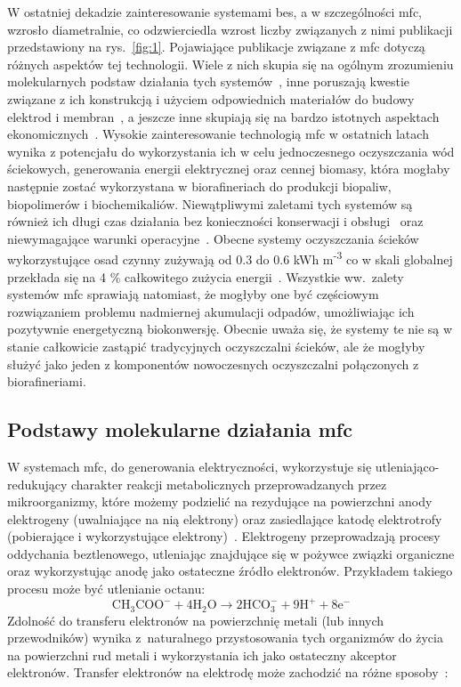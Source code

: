 W ostatniej dekadzie zainteresowanie systemami \acrshort{bes},
a w szczególności \acrshort{mfc}, wzrosło diametralnie, co odzwierciedla wzrost
liczby związanych z nimi publikacji przedstawiony na rys.~\ref{fig:1}.
Pojawiające publikacje związane z \acrshort{mfc}
dotyczą różnych aspektów tej technologii.
Wiele z nich skupia się na ogólnym zrozumieniu molekularnych podstaw
działania tych systemów~\cite{Slate2019, Bruce2006, Lovley2006}, inne
poruszają kwestie związane z ich konstrukcją i użyciem odpowiednich
materiałów do budowy elektrod i membran~\cite{Kaur2020, Daud2015},
a jeszcze inne skupiają się na bardzo istotnych
aspektach ekonomicznych~\cite{Trapero2017}.
Wysokie zainteresowanie technologią \acrshort{mfc} w ostatnich latach wynika
z potencjału do wykorzystania ich w celu jednoczesnego oczyszczania
wód ściekowych, generowania energii elektrycznej oraz cennej biomasy,
która mogłaby następnie zostać wykorzystana w biorafineriach do produkcji
biopaliw, biopolimerów i biochemikaliów.
Niewątpliwymi zaletami tych systemów są również ich długi czas działania
bez konieczności konserwacji i obsługi~\cite{Habermann1991}
oraz niewymagające warunki operacyjne~\cite{Slate2019}.
Obecne systemy oczyszczania ścieków wykorzystujące osad czynny
zużywają od 0.3 do 0.6 kWh m\textsuperscript{-3} co w skali globalnej
przekłada się na 4 \% całkowitego zużycia energii~\cite{AlSayed2020}.
Wszystkie ww.\ zalety systemów \acrshort{mfc} sprawiają natomiast, że mogłyby one
być częściowym rozwiązaniem problemu nadmiernej akumulacji odpadów,
umożliwiając ich pozytywnie energetyczną biokonwersję.
Obecnie uważa się, że systemy te nie są w stanie całkowicie zastąpić
tradycyjnych oczyszczalni ścieków, ale że mogłyby służyć
jako jeden z komponentów nowoczesnych oczyszczalni połączonych
z biorafineriami.

\subsection{Podstawy molekularne działania \acrshort{mfc}}\label{subsec:podstawy-molekularne}
W systemach \acrshort{mfc}, do generowania elektryczności, wykorzystuje się
utleniająco-redukujący charakter reakcji metabolicznych
przeprowadzanych przez mikroorganizmy, które możemy podzielić
na rezydujące na powierzchni anody elektrogeny (uwalniające na nią
elektrony) oraz zasiedlające katodę elektrotrofy
(pobierające i wykorzystujące elektrony)~\cite{AlSayed2020}.
Elektrogeny przeprowadzają procesy oddychania beztlenowego,
utleniając znajdujące się w pożywce związki organiczne oraz
wykorzystując anodę jako ostateczne źródło elektronów.
Przykładem takiego procesu może być utlenianie octanu:
\begin{equation}
    \label{eq:1}
    \mathrm{CH_3 COO^- + 4H_2 O \rightarrow 2HCO_3^- + 9H^+ + 8e^-}
\end{equation}
Zdolność do transferu elektronów na powierzchnię metali (lub
innych przewodników) wynika z~naturalnego przystosowania tych
organizmów do życia na powierzchni rud metali i wykorzystania
ich jako ostateczny akceptor elektronów.
Transfer elektronów na elektrodę może zachodzić na różne
sposoby~\cite{Santoro2017}:

